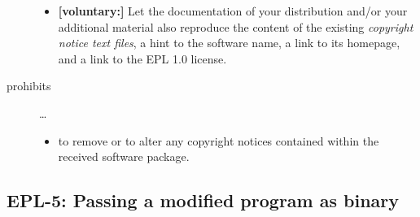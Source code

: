 \begin{description}
\begin{itemize}
  \item \textbf{[voluntary:]} Let the documentation of your distribution and/or
  your additional material also reproduce the content of the existing
  \emph{copyright notice text files}, a hint to the software name, a link to its
  homepage, and a link to the EPL 1.0 license.
  
 \end{itemize}
 
\item[prohibits] \ldots
\begin{itemize}
  \item to remove or to alter any copyright notices contained within the
  received software package.
\end{itemize}

\end{description}

\subsection{EPL-5: Passing a modified program as binary}

